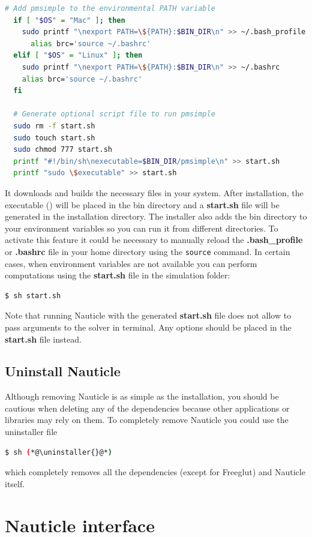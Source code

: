 \documentclass[a4paper,12pt,openany]{book}
\theoremstyle{break}
\begin{document}
\begin{example}{\installer{}}{}
\begin{lstlisting}[language=bash]
  # Add pmsimple to the environmental PATH variable
  if [ "$OS" = "Mac" ]; then
    sudo printf "\nexport PATH=\${PATH}:$BIN_DIR\n" >> ~/.bash_profile
      alias brc='source ~/.bashrc'
  elif [ "$OS" = "Linux" ]; then
    sudo printf "\nexport PATH=\${PATH}:$BIN_DIR\n" >> ~/.bashrc
    alias brc='source ~/.bashrc'
  fi

  # Generate optional script file to run pmsimple 
  sudo rm -f start.sh
  sudo touch start.sh
  sudo chmod 777 start.sh
  printf "#!/bin/sh\nexecutable=$BIN_DIR/pmsimple\n" >> start.sh
  printf "sudo \$executable" >> start.sh
\end{lstlisting}
\end{example}

It downloads and builds the necessary files in your system. After installation, the executable (\execname{}) will be placed in the bin directory and a \textbf{start.sh} file will be generated in the installation directory. The installer also adds the bin directory to your environment variables so you can run it from different directories. To activate this feature it could be necessary to manually reload the \textbf{.bash\_profile} or \textbf{.bashrc} file in your home directory using the \texttt{source} command.
In certain cases, when environment variables are not available you can perform computations using the \textbf{start.sh} file in the simulation folder:
\begin{lstlisting}[language=bash]
  $ sh start.sh
\end{lstlisting}
Note that running Nauticle with the generated \textbf{start.sh} file does not allow to pass arguments to the solver in terminal. Any options should be placed in the \textbf{start.sh} file instead.
\subsection{Uninstall Nauticle}
Although removing Nauticle is as simple as the installation, you should be cautious when deleting any of the dependencies because other applications or libraries may rely on them.  To completely remove Nauticle you could use the uninstaller file
\begin{lstlisting}[language=bash]
  $ sh (*@\uninstaller{}@*)
\end{lstlisting}
which completely removes all the dependencies (except for Freeglut) and Nauticle itself.
\section{Nauticle interface}
\end{document}
